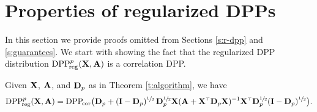 \documentclass[thesis.tex]{subfiles}
\begin{document}
\section{Properties of regularized DPPs}
\label{a:proofs}
In this section we provide proofs omitted from Sections \ref{s:r-dpp}
and \ref{s:guarantees}. We start with showing the fact that the
regularized DPP distribution ${{\mathrm{DPP}}_{\!\mathrm{reg}}^{p}}(\mathbf X,\mathbf A)$ is a correlation DPP.
\begin{lemma}
  Given $\mathbf X$, $\mathbf A$, and $\mathbf D_p$ as in Theorem \ref{t:algorithm}, we have
  \begin{align*}
    \DPPreg{p}(\X,\A)= \DPPcor\big(\D_p +
    (\I-\D_p)^{\sfrac12}\,\D_p^{\sfrac12}\X(\A+\X^\top\D_p\X)^{-1}\X^\top\D_p^{\sfrac12}(\I-\D_p)^{\sfrac12}\big).
    \end{align*}
  \end{lemma}
\end{document}
